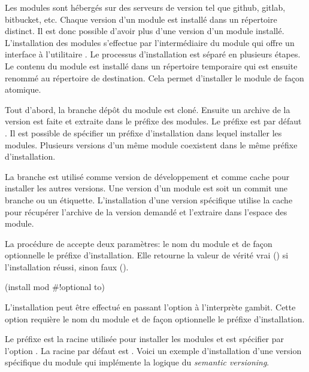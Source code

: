


Les modules sont hébergés sur des serveurs de version tel que github, gitlab,
bitbucket, etc. Chaque version d'un module est installé dans un répertoire
distinct. Il est donc possible d'avoir plus d'une version d'un module installé.
L'installation des modules s'effectue par l'intermédiaire du module
 qui offre un interface à l'utilitaire . Le
processus d'installation est séparé en plusieurs étapes.  Le contenu du module
est installé dans un répertoire temporaire qui est ensuite renommé au
répertoire de destination. Cela permet d'installer le module de façon atomique.

Tout d'abord, la
branche  dépôt du module est cloné. Ensuite un archive de la
version est faite et extraite dans le préfixe des modules. Le préfixe est par
défaut .  Il est possible de spécifier un préfixe
d'installation dans lequel installer les modules. Plusieurs versions d'un même
module coexistent dans le même préfixe d'installation.

La branche  est utilisé comme version de développement et
comme cache pour installer les autres versions. Une version d'un module est soit
un commit une branche ou un étiquette. L'installation d'une version
spécifique utilise la cache pour récupérer l'archive de la version demandé
et l'extraire dans l'espace des module.

La procédure  de  accepte deux paramètres:
le nom du module et de façon optionnelle le préfixe d'installation. Elle
retourne la valeur de vérité vrai () si l'installation réussi,
sinon faux ().
\begin{center}
  \begin{mplisting}{0.4}
(install mod #!optional to)
\end{mplisting}
\end{center}

L'installation peut être effectué en passant l'option 
à l'interprète gambit. Cette option requière le nom du module et
de façon optionnelle le préfixe d'installation.
\begin{center}
\end{center}
Le préfixe  est la racine utilisée pour installer les modules
et est spécifier par l'option .  La racine par défaut est
. Voici un exemple d'installation d'une version spécifique du module
 qui implémente la logique du \textit{semantic versioning}.

